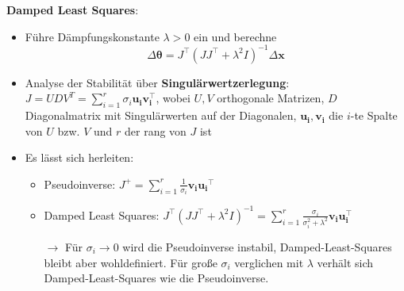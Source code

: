 \textbf{Damped Least Squares}:
\begin{itemize}
	\item Führe Dämpfungskonstante $\lambda>0$ ein und berechne 
	$$\Delta\boldsymbol{\theta}=J^\top(JJ^\top+\lambda^2I)^{-1}\Delta\mathbf{x}$$
	\item Analyse der Stabilität über \textbf{Singulärwertzerlegung}: $J=UDV^T=\sum\limits_{i=1}^r \sigma_i \mathbf{u_iv_i^\top}$, wobei $U,V$ orthogonale Matrizen, $D$ Diagonalmatrix mit Singulärwerten auf der Diagonalen, $\mathbf{u_i},\mathbf{v_i}$ die $i$-te Spalte von $U$ bzw. $V$ und $r$ der rang von $J$ ist
	\newpage
	
	\item Es lässt sich herleiten:
	\begin{itemize}
		\item Pseudoinverse: $J^+=\sum\limits_{i=1}^r \frac{1}{\sigma_i}\mathbf{v_i} \mathbf{u_i}^\top$
		\item Damped Least Squares: $J^\top(JJ^\top+\lambda^2I)^{-1}=\sum\limits_{i=1}^r \frac{\sigma_i}{\sigma_i^2+\lambda^2}\mathbf{v_i}\mathbf{u_i^\top}$
		
		$\rightarrow$ Für $\sigma_i\rightarrow 0$ wird die Pseudoinverse instabil, Damped-Least-Squares bleibt aber wohldefiniert. Für große $\sigma_i$ verglichen mit $\lambda$ verhält sich Damped-Least-Squares wie die Pseudoinverse.
	\end{itemize}
\end{itemize}